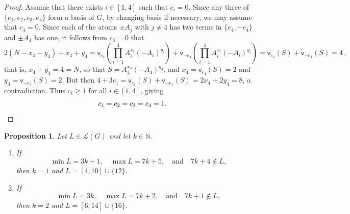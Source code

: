 \documentclass[a4paper, 10pt]{amsart}
\theoremstyle{plain}
\newtheorem{proposition}[theorem]{\bf Proposition}
\theoremstyle{definition}
\theoremstyle{definition}
\newcommand{\N}{\mathbb N}
\numberwithin{equation}{section}
\begin{document}
\begin{proof}
	Assume that there exists $i\in [1,4]$ such that $c_i=0$.
	 Since any three of $\{e_1,e_2,e_3,e_4\}$ form a basis of $G$, by changing basis if necessary, we may assume that $c_4=0$.
	  Since each of the atoms
	$\pm A_j$ with $j \ne 4$ has two terms in $\{e_4,-e_4\}$ and $\pm A_4$ has
	one, it follows from $c_4=0$ that $$2(N-x_4-y_4)+x_4+y_4= \mathsf v_{e_4}\left(\prod_{i=1}^4 A_i^{x_i}(-A_i)^{y_i}\right)+\mathsf v_{-e_4}\left(\prod_{i=1}^4 A_i^{x_i}(-A_i)^{y_i}\right) =\mathsf v_{e_4}(S)+\mathsf v_{-e_4}(S) = 4\,,$$ that is, $x_4+y_4=4=N$, so that
	$S=A_4^{x_4}(-A_4)^{y_4}$, and $x_4=\mathsf v_{e_4}(S)=2$ and
	$y_4=\mathsf v_{-e_4}(S)=2$.  But then
	$4+3c_1=\mathsf v_{e_1}(S)+\mathsf v_{-e_1}(S)=2x_4+2y_4=8$, a contradiction. Thus $c_i\ge 1$ for all $i\in [1,4]$, giving
	\[
	c_1=c_2=c_3=c_4=1. \qedhere
	\]
\end{proof}


\begin{proposition} \label{prop:saturated-three-q-plus-one}
Let $L \in \mathcal L (G)$ and let $k\in\N$.
\begin{enumerate}
\item If
      \[
       \min  L =3k+1,
       \quad\max L =7k+5,
       \quad \text{and} \quad 7k+4\notin  L ,
      \]
      then $k=1$ and
      $L  = [4,10]\cup\{12\}$.
\item If
      \[
       \min  L =3k,
       \quad\max  L =7k+2,
       \quad \text{and} \quad 7k+1\notin  L,
      \]
      then $k=2$ and 
      $L  = [6,14]\cup\{16\}$.
\end{enumerate}
\end{proposition}
\end{document}
